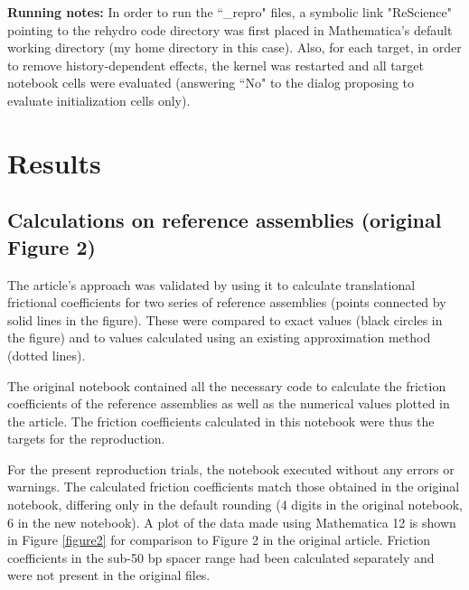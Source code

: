 \textbf{Running notes:} In order to run the ``\_repro" files, a symbolic link "ReScience" pointing to the rehydro code directory was first placed in Mathematica's default working directory (my home directory in this case). Also, for each target, in order to remove history-dependent effects, the kernel was restarted and all target notebook cells were evaluated (answering ``No" to the dialog proposing to evaluate initialization cells only).

\section{Results}


\subsection{Calculations on reference assemblies (original Figure 2)}

The article's approach was validated by using it to calculate translational frictional coefficients for two series of reference assemblies (points connected by solid lines in the figure). These were compared to exact values (black circles in the figure) and to values calculated using an existing approximation method (dotted lines).

The original notebook
contained all the necessary code to calculate the friction coefficients of the reference assemblies as well as the numerical values plotted in the article. The friction coefficients calculated in this notebook were thus the targets for the reproduction.

For the present reproduction trials, the notebook executed without any errors or warnings. The calculated friction coefficients match those obtained in the original notebook, differing only in the default rounding (4 digits in the original notebook, 6 in the new notebook). A plot of the data made using Mathematica 12 is shown in Figure \ref{figure2} for comparison to Figure 2 in the original article. Friction coefficients in the sub-50 bp spacer range had been calculated separately and were not present in the original files.

